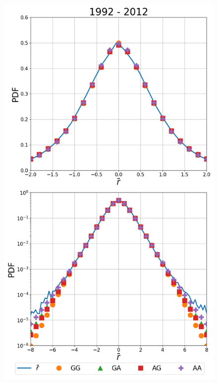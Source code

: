 \begin{figure}[htbp]
    \centering
    \includegraphics[width=\columnwidth]
    {figures/04_all_1992.png}
    \caption{}
    \label{fig:empirical_1992}
\end{figure}

